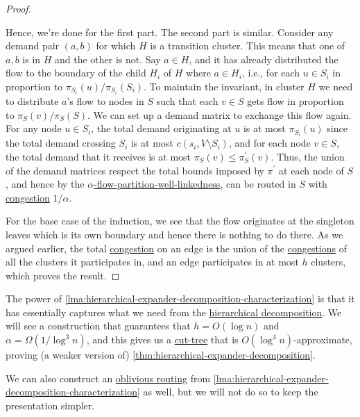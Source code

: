 \begin{proof}
\begin{explanation}
	\end{explanation}
	Hence, we're done for the first part. The second part is similar. Consider any demand pair \((a, b)\) for which \(H\) is a transition cluster. This means that one of \(a, b\) is in \(H\) and the other is not. Say \(a \in H\), and it has already distributed the flow to the boundary of the child \(H_i\) of \(H\) where \(a \in H_i\), i.e., for each \(u \in S_i\) in proportion to \(\pi _{S_i}(u) / \pi _{S_i}(S_i)\). To maintain the invariant, in cluster \(H\) we need to distribute \(a\)'s flow to nodes in \(S\) such that each \(v \in S\) gets flow in proportion to \(\pi _S(v) / \pi _S(S)\). We can set up a demand matrix to exchange this flow again. For any node \(u \in S_i\), the total demand originating at \(u\) is at most \(\pi _{S_i}(u)\) since the total demand crossing \(S_i\) is at most \(c(s_i, V\setminus S_i)\), and for each node \(v \in S\), the total demand that it receives is at most \(\pi _S(v) \leq \pi _S^{\prime} (v)\). Thus, the union of the demand matrices respect the total bounds imposed by \(\pi ^{\prime} \) at each node of \(S\), and hence by the \hyperref[def:partition-and-boundary-well-linked]{\(\alpha \)-flow-partition-well-linkedness}, can be routed in \(S\) with \hyperref[def:congestion]{congestion} \(1 / \alpha \).

	For the base case of the induction, we see that the flow originates at the singleton leaves which is its own boundary and hence there is nothing to do there. As we argued earlier, the total \hyperref[def:congestion]{congestion} on an edge is the union of the \hyperref[def:congestion]{congestions} of all the clusters it participates in, and an edge participates in at most \(h\) clusters, which proves the result.
\end{proof}

The power of \autoref{lma:hierarchical-expander-decomposition-characterization} is that it has essentially captures what we need from the \hyperref[def:hierarchical-decomposition]{hierarchical decomposition}. We will see a construction that guarantees that \(h = O(\log n)\) and \(\alpha = \Omega (1 / \log ^3 n)\), and this gives us a \hyperref[def:cut-tree]{cut-tree} that is \(O(\log ^4 n)\)-approximate, proving (a weaker version of) \autoref{thm:hierarchical-expander-decomposition}.

\begin{remark}
	We can also construct an \hyperref[def:oblivious-routing-scheme]{oblivious routing} from \autoref{lma:hierarchical-expander-decomposition-characterization} as well, but we will not do so to keep the presentation simpler.
\end{remark}